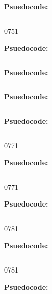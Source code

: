 
\textbf{Psuedocode:}
\begin{verbatim}
\end{verbatim}


      {075}{1}

\textbf{Psuedocode:}
\begin{verbatim}
\end{verbatim}



\textbf{Psuedocode:}
\begin{verbatim}
\end{verbatim}



\textbf{Psuedocode:}
\begin{verbatim}
\end{verbatim}



\textbf{Psuedocode:}
\begin{verbatim}
\end{verbatim}


      {077}{1}

\textbf{Psuedocode:}
\begin{verbatim}
\end{verbatim}


      {077}{1}

\textbf{Psuedocode:}
\begin{verbatim}
\end{verbatim}


   {078}{1}

\textbf{Psuedocode:}
\begin{verbatim}
\end{verbatim}


   {078}{1}

\textbf{Psuedocode:}
\begin{verbatim}
\end{verbatim}



